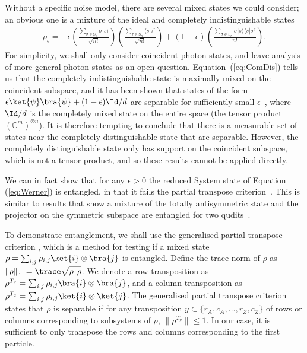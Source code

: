 Without a specific noise model, there are several mixed states we could consider; an obvious one is a mixture of the ideal and completely indistinguishable states
\begin{align}
\label{eq:Werner}
\rho_\epsilon 
=& \epsilon\left(\frac{\sum_{\sigma \in  \textrm{S}_n}\sigma|s\rangle}{\sqrt{n!}}\right)\left(\frac{\sum_{\tau \in  \textrm{S}_n}\langle s|\tau^\dagger}{\sqrt{n!}}\right) + (1-\epsilon)\left(\frac{\sum_{\sigma \in  \textrm{S}_n}\sigma|s\rangle\langle s|\sigma^\dagger}{{n!}}\right).
\end{align}
For simplicity, we shall only consider coincident photon states, and leave analysis of more general photon states as an open question.
Equation~(\ref{eq:ComDis}) tells us that the completely indistinguishable state is maximally mixed on the coincident subspace, and it has been shown that states of the form $\epsilon\ket{\psi}\bra{\psi} + (1-\epsilon)\Id/d$ are separable for sufficiently small $\epsilon$~\cite{braunstein1999, rungta2001}, where $\Id/d$ is the completely mixed state on the entire space (the tensor product $(\mathbb{C}^m)^{\otimes n}$).
It is therefore tempting to conclude that there is a measurable set of states near the completely distinguishable state that are separable.
However, the completely distinguishable state only has support on the coincident subspace, which is not a tensor product, and so these results cannot be applied directly.

We can in fact show that for any $\epsilon>0$ the reduced System state of Equation (\ref{eq:Werner}) is entangled, in that it fails the partial transpose criterion~\cite{chen2002}.
This is similar to results that show a mixture of the totally antisymmetric state and the projector on the symmetric subspace are entangled for two qudits~\cite{breuer2006}.

To demonstrate entanglement, we shall use the generalised partial transpose criterion \cite{chen2002}, which is a method for testing if a mixed state $\rho = \sum_{i,j}\rho_{i,j}\ket{i}\otimes\bra{j}$ is entangled. Define the trace norm of $\rho$ as $\|\rho\| \colon= \trace\sqrt{\rho^\dagger\rho}$. We denote a row transposition as $\rho^{T_{r}} = \sum_{i,j}\rho_{i,j}\bra{i}\otimes\bra{j}$, and a column transposition as $\rho^{T_{c}} = \sum_{i,j}\rho_{i,j}\ket{i}\otimes\ket{j}$. The generalised partial transpose criterion states that $\rho$ is separable if for any transposition $y \subset \{r_A,c_A,\dots,r_Z,c_Z\}$ of rows or columns corresponding to subsystems of $\rho$, $\|\rho^{T_y}\| \leq 1$. In our case, it is sufficient to only transpose the rows and columns corresponding to the first particle.

